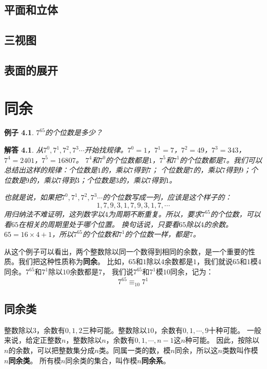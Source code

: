 \documentclass[12pt,UTF8]{ctexbook}
\newtheorem{ex}{例子}[section]
\newtheorem*{so}{解答}
\begin{document}
\section{平面和立体}
\section{三视图}
\section{表面的展开}

\chapter{同余}
\begin{ex}\label{ex:3-0-0}
    $7^{65}$的个位数是多少？
\end{ex}
\begin{so}
    从$7^0,7^1,7^2,7^3\cdots$开始找规律。$7^0=1$，$7^1=7$，$7^2=49$，$7^3=343$，$7^4=2401$，$7^5=16807$。
    $7^4$和$7^0$的个位数都是$1$，$7^5$和$7^1$的个位数都是$7$。我们可以总结出这样的规律：个位数是$1$的，乘以$7$得到$7$；
    个位数是$7$的，乘以$7$得到$9$；个位数是$9$的，乘以$7$得到$3$；个位数是$3$的，乘以$7$得到$1$。

    也就是说，如果把$7^0,7^1,7^2,7^3\cdots$的个位数写成一列，应该是这个样子的：
    $$ 1, 7, 9, 3, 1, 7, 9, 3, 1, 7, \cdots$$
    用归纳法不难证明，这列数字以$4$为周期不断重复。所以，要求$7^{65}$的个位数，可以看$65$在相关的周期里处于哪个位置。
    换句话说，只要看$65$除以$4$的余数。$65 = 16 \times 4 + 1$，所以$7^{65}$的个位数和$7^1$的个位数一样，都是$7$。
\end{so}

从这个例子可以看出，两个整数除以同一个数得到相同的余数，是一个重要的性质。我们把这种性质称为\textbf{同余}。
比如，$65$和$1$除以$4$余数都是$1$，我们就说$65$和$1$模$4$同余。$7^{65}$和$7^1$除以$10$余数都是$7$，
我们说$7^{65}$和$7^1$模$10$同余，记为：
$$ 7^{65} \equiv_{10} 7^1 $$

\section{同余类}
整数除以$3$，余数有$0,1,2$三种可能。整数除以$10$，余数有$0,1,\cdots , 9$十种可能。
一般来说，给定正整数$n$，整数除以$n$，余数有$0,1,\cdots , n-1$这$n$种可能。
因此，按除以$n$的余数，可以把整数集分成$n$类。同属一类的数，模$n$同余，所以这$n$类数叫作模$n$\textbf{同余类}。
所有模$n$同余类的集合，叫作模$n$\textbf{同余系}。
\end{document}
